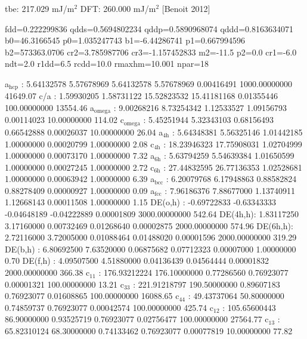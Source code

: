\documentclass[11pt]{article}
\begin{document}
tbe:       217.029 mJ/m\(^{\text{2}}\)
DFT:       260.000 mJ/m\(^{\text{2}}\) [Benoit  2012]


fdd=0.222299836 qdds=0.5694802234 qddp=0.5890968074 qddd=0.8163634071 b0=46.3166545 p0=1.035247743 b1=-6.44286741 p1=0.667994596 b2=573363.0706 cr2=3.785987706 cr3=-1.157452833 m2=-11.5 p2=0.0 cr1=-6.0 ndt=2.0 r1dd=6.5 rcdd=10.0 rmaxhm=10.001 npar=18

a\(_{\text{hcp}}\)   :   5.64132578   5.57678969   5.64132578   5.57678969   0.00416491 1000.00000000     41649.07
c/a     :   1.59930205   1.58731122  15.52823532  15.41181168   0.01355446 100.00000000     13554.46
a\(_{\text{omega}}\) :   9.00268216   8.73254342   1.12533527   1.09156793   0.00114023  10.00000000       114.02
c\(_{\text{omega}}\) :   5.45251944   5.32343103   0.68156493   0.66542888   0.00026037  10.00000000        26.04
a\(_{\text{4h}}\)    :   5.64348381   5.56325146   1.01442185   1.00000000   0.00020799   1.00000000         2.08
c\(_{\text{4h}}\)    :  18.23946323  17.75908031   1.02704999   1.00000000   0.00073170   1.00000000         7.32
a\(_{\text{6h}}\)    :   5.63794259   5.54639384   1.01650599   1.00000000   0.00027245   1.00000000         2.72
c\(_{\text{6h}}\)    :  27.44832595  26.77136353   1.02528681   1.00000000   0.00063942   1.00000000         6.39
a\(_{\text{bcc}}\)   :   6.20079768   6.17948863   0.88582824   0.88278409   0.00000927   1.00000000         0.09
a\(_{\text{fcc}}\)   :   7.96186376   7.88677000   1.13740911   1.12668143   0.00011508   1.00000000         1.15
DE(o,h) :  -0.69722833  -0.63343333  -0.04648189  -0.04222889   0.00001809 3000.00000000       542.64
DE(4h,h):   1.83117250   3.17160000   0.00732469   0.01268640   0.00002875 2000.00000000       574.96
DE(6h,h):   2.72116000   3.72005000   0.01088464   0.01488020   0.00001596 2000.00000000       319.29
DE(b,h) :   6.80692500   7.63520000   0.06875682   0.07712323   0.00007000   1.00000000         0.70
DE(f,h) :   4.09507500   4.51880000   0.04136439   0.04564444   0.00001832 2000.00000000       366.38
c\(_{\text{11}}\)    : 176.93212224 176.10000000   0.77286560   0.76923077   0.00001321 100.00000000        13.21
c\(_{\text{33}}\)    : 221.91218797 190.50000000   0.89607183   0.76923077   0.01608865 100.00000000     16088.65
c\(_{\text{44}}\)    :  49.43737064  50.80000000   0.74859737   0.76923077   0.00042574 100.00000000       425.74
c\(_{\text{12}}\)    : 105.65600443  86.90000000   0.93525719   0.76923077   0.02756477 100.00000000     27564.77
c\(_{\text{13}}\)    :  65.82310124  68.30000000   0.74133462   0.76923077   0.00077819  10.00000000        77.82
\end{document}

